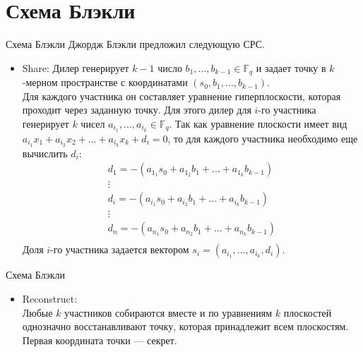 \documentclass{beamer}
\begin{document}
\section{Схема Блэкли}
\begin{frame}{Схема Блэкли}
    Джордж Блэкли предложил следующую СРС. \\
    \begin{itemize}
        \item Share:
        Дилер генерирует \(k - 1\) число \(b_1, \dots, b_{k - 1} \in \mathbb{F}_q\) и задает точку в \(k\)-мерном пространстве с координатами \((s_0, b_1, \dots, b_{k - 1})\). \\Для каждого участника он составляет уравнение гиперплоскости, которая проходит через заданную точку. Для этого дилер для \(i\)-го участника генерирует \(k\) чисел \(a_{i_1}, \dots, a_{i_k} \in \mathbb{F}_q\).
        Так как уравнение плоскости имеет вид
        \(
        a_{i_1}x_1 + a_{i_2}x_2 + \dots + a_{i_k}x_k + d_i = 0
        \), то для каждого участника необходимо еще вычислить \(d_i\):
        \[
        \begin{smallmatrix}
             d_1 = - (a_{1_1}s_0 + a_{1_2}b_1 + \dots + a_{1_k}b_{k-1}) \\
             \vdots \\
             d_i = - (a_{i_1}s_0 + a_{i_2}b_1 + \dots + a_{i_k}b_{k-1}) \\
             \vdots \\
             d_n = - (a_{n_1}s_0 + a_{n_2}b_1 + \dots + a_{n_k}b_{k-1}) \\
        \end{smallmatrix}
        \]
        Доля \(i\)-го участника задается вектором \(s_i = (a_{i_1}, \dots, a_{i_k}, d_i)\).
    \end{itemize}
\end{frame}

\begin{frame}{Схема Блэкли}
    \begin{itemize}
        \item Reconstruct: \\
        Любые \(k\) участников собираются вместе и по уравнениям \(k\) плоскостей однозначно восстанавливают точку, которая принадлежит всем плоскостям. \\
        Первая координата точки --- секрет.
    \end{itemize}
\end{frame}
\end{document}

